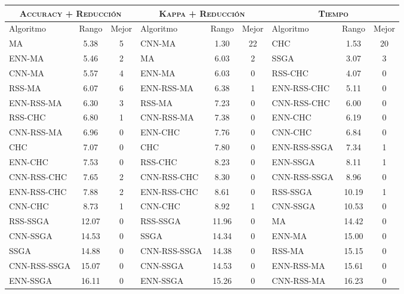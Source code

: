 \begin{table}[]
\centering
\begin{adjustbox}{max width =\textwidth}
\begin{tabular}{l c c|l c c|l c c}
\hline
\multicolumn{3}{c|}{\textsc{Accuracy + Reducción}}
	& \multicolumn{3}{c|}{\textsc{Kappa + Reducción}}
	& \multicolumn{3}{c}{\textsc{Tiempo}} \\
\hline
Algoritmo & Rango & Mejor & Algoritmo & Rango & Mejor & Algoritmo & Rango & Mejor \\
\hline
\hline

MA           & 5.38  & 5 & CNN-MA       & 1.30  & 22 & CHC          & 1.53  & 20 \\
ENN-MA       & 5.46  & 2 & MA           & 6.03  & 2  & SSGA         & 3.07  & 3 \\
CNN-MA       & 5.57  & 4 & ENN-MA       & 6.03  & 0  & RSS-CHC      & 4.07  & 0 \\
RSS-MA       & 6.07  & 6 & ENN-RSS-MA   & 6.38  & 1  & ENN-RSS-CHC  & 5.11  & 0 \\
ENN-RSS-MA   & 6.30  & 3 & RSS-MA       & 7.23  & 0  & CNN-RSS-CHC  & 6.00  & 0 \\
RSS-CHC      & 6.80  & 1 & CNN-RSS-MA   & 7.38  & 0  & ENN-CHC      & 6.19  & 0 \\
CNN-RSS-MA   & 6.96  & 0 & ENN-CHC      & 7.76  & 0  & CNN-CHC      & 6.84  & 0 \\
CHC          & 7.07  & 0 & CHC          & 7.80  & 0  & ENN-RSS-SSGA & 7.34  & 1 \\
ENN-CHC      & 7.53  & 0 & RSS-CHC      & 8.23  & 0  & ENN-SSGA     & 8.11  & 1 \\
CNN-RSS-CHC  & 7.65  & 2 & CNN-RSS-CHC  & 8.30  & 0  & CNN-RSS-SSGA & 8.96  & 0 \\
ENN-RSS-CHC  & 7.88  & 2 & ENN-RSS-CHC  & 8.61  & 0  & RSS-SSGA     & 10.19 & 1 \\
CNN-CHC      & 8.73  & 1 & CNN-CHC      & 8.92  & 1  & CNN-SSGA     & 10.53 & 0 \\
RSS-SSGA     & 12.07 & 0 & RSS-SSGA     & 11.96 & 0  & MA           & 14.42 & 0 \\
CNN-SSGA     & 14.53 & 0 & SSGA         & 14.34 & 0  & ENN-MA       & 15.00 & 0 \\
SSGA         & 14.88 & 0 & CNN-RSS-SSGA & 14.38 & 0  & RSS-MA       & 15.15 & 0 \\
CNN-RSS-SSGA & 15.07 & 0 & CNN-SSGA     & 14.53 & 0  & ENN-RSS-MA   & 15.61 & 0 \\
ENN-SSGA     & 16.11 & 0 & ENN-SSGA     & 15.26 & 0  & CNN-RSS-MA   & 16.23 & 0 \\

\end{tabular}
\end{adjustbox}
\end{table}
